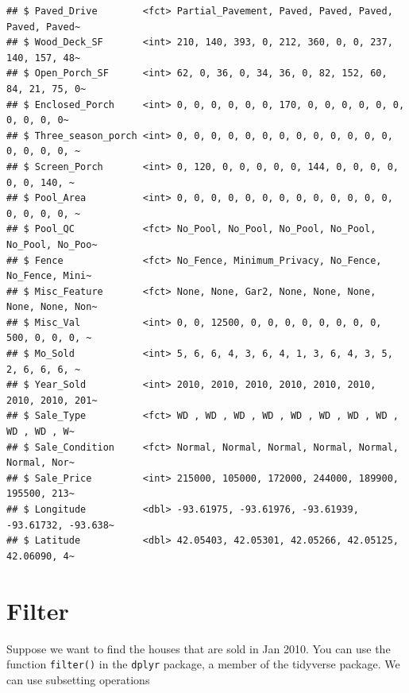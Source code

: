 \documentclass[
]{book}
\newenvironment{Shaded}{\begin{snugshade}}{\end{snugshade}}
\newcommand{\DecValTok}[1]{\textcolor[rgb]{0.00,0.00,0.81}{#1}}
\newcommand{\NormalTok}[1]{#1}
\newcommand{\SpecialCharTok}[1]{\textcolor[rgb]{0.00,0.00,0.00}{#1}}
\begin{document}
\begin{verbatim}
## $ Paved_Drive        <fct> Partial_Pavement, Paved, Paved, Paved, Paved, Paved~
## $ Wood_Deck_SF       <int> 210, 140, 393, 0, 212, 360, 0, 0, 237, 140, 157, 48~
## $ Open_Porch_SF      <int> 62, 0, 36, 0, 34, 36, 0, 82, 152, 60, 84, 21, 75, 0~
## $ Enclosed_Porch     <int> 0, 0, 0, 0, 0, 0, 170, 0, 0, 0, 0, 0, 0, 0, 0, 0, 0~
## $ Three_season_porch <int> 0, 0, 0, 0, 0, 0, 0, 0, 0, 0, 0, 0, 0, 0, 0, 0, 0, ~
## $ Screen_Porch       <int> 0, 120, 0, 0, 0, 0, 0, 144, 0, 0, 0, 0, 0, 0, 140, ~
## $ Pool_Area          <int> 0, 0, 0, 0, 0, 0, 0, 0, 0, 0, 0, 0, 0, 0, 0, 0, 0, ~
## $ Pool_QC            <fct> No_Pool, No_Pool, No_Pool, No_Pool, No_Pool, No_Poo~
## $ Fence              <fct> No_Fence, Minimum_Privacy, No_Fence, No_Fence, Mini~
## $ Misc_Feature       <fct> None, None, Gar2, None, None, None, None, None, Non~
## $ Misc_Val           <int> 0, 0, 12500, 0, 0, 0, 0, 0, 0, 0, 0, 500, 0, 0, 0, ~
## $ Mo_Sold            <int> 5, 6, 6, 4, 3, 6, 4, 1, 3, 6, 4, 3, 5, 2, 6, 6, 6, ~
## $ Year_Sold          <int> 2010, 2010, 2010, 2010, 2010, 2010, 2010, 2010, 201~
## $ Sale_Type          <fct> WD , WD , WD , WD , WD , WD , WD , WD , WD , WD , W~
## $ Sale_Condition     <fct> Normal, Normal, Normal, Normal, Normal, Normal, Nor~
## $ Sale_Price         <int> 215000, 105000, 172000, 244000, 189900, 195500, 213~
## $ Longitude          <dbl> -93.61975, -93.61976, -93.61939, -93.61732, -93.638~
## $ Latitude           <dbl> 42.05403, 42.05301, 42.05266, 42.05125, 42.06090, 4~
\end{verbatim}

\hypertarget{filter}{%
\section{Filter}\label{filter}}

Suppose we want to find the houses that are sold in Jan 2010. You can use the function \texttt{filter()} in the \texttt{dplyr} package, a member of the tidyverse package. We can use subsetting operations

\begin{Shaded}
\end{Shaded}
\end{document}
